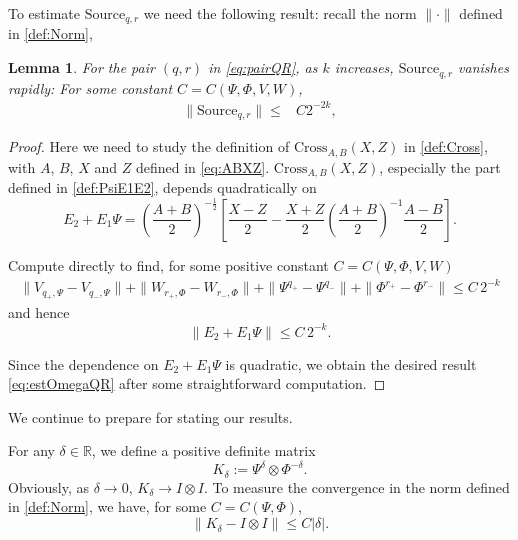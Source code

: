\documentclass{article}
\numberwithin{equation}{section}
\newtheorem{lemma}[theorem]{Lemma}
\begin{document}
To estimate $\text{Source}_{q,r}$ we need the following result: recall the norm $\|\cdot\|$ defined in \eqref{def:Norm},
\begin{lemma}
 For the pair $(q,r) $ in \eqref{eq:pairQR}, as $k$ increases, $\text{Source}_{q,r}$ vanishes rapidly: For some constant $C=C(\Psi,\Phi,V,W)$,
  \begin{align}\label{eq:estOmegaQR}
    \|\text{Source}_{q,r}\|\leq & C 2^{-2k},
  \end{align}
\end{lemma}
\begin{proof}
Here we need to study the definition of $\text{Cross}_{A,B}(X,Z)$ in \eqref{def:Cross}, with $A$, $B$, $X$ and $Z$ defined in \eqref{eq:ABXZ}. 
$\text{Cross}_{A,B}(X,Z)$, especially the part defined in \eqref{def:PsiE1E2}, depends quadratically on
\[
E_2 + E_1 \Psi = \left( \frac{A+B}{2} \right)^{-\frac{1}{2}} \left[ \frac{X-Z}{2} - \frac{X+Z}{2} \left( \frac{A+B}{2} \right)^{-1} \frac{A-B}{2} \right].
\]



Compute directly to find, for some positive constant $C=C(\Psi,\Phi,V,W)$
\begin{align*}
\| V_{q_+ ,\Psi} - V_{q_- ,\Psi} \| +
\| W_{r_+ ,\Phi} - W_{r_- ,\Phi} \| +
\| \Psi^{q_+} - \Psi^{q_-} \| + 
\| \Phi^{r_+} - \Phi^{r_-} \| \leq C \, 2^{-k}
\end{align*} and hence
\[
\|E_2 + E_1 \Psi\|\leq C \, 2^{-k}.
\]


Since the dependence on $E_2 + E_1 \Psi$ is quadratic, we obtain the desired result \eqref{eq:estOmegaQR} after some straightforward computation.


\end{proof}


We continue to prepare for stating our results.

For any $\delta \in \mathbb{R}$, we define a positive definite matrix 
\begin{equation}\label{def:Hdelta}
  K_{\delta} := \Psi^{\delta} \otimes \Phi^{-\delta}.
\end{equation}
Obviously, as $\delta \to 0$, $K_{\delta}\rightarrow I\otimes I$. To measure the convergence in the norm defined in \eqref{def:Norm}, we have, for some $C=C(\Psi,\Phi)$,
\begin{equation}\label{eq:HDelta}
\| K_{\delta} - I \otimes I \| \le C |\delta|.
\end{equation}
\end{document}
